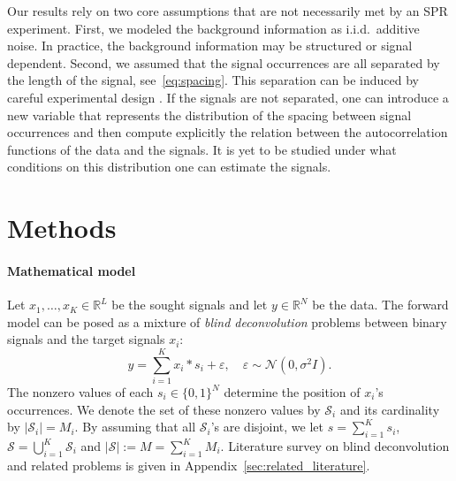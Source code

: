 \documentclass[english,11pt]{article}
\newcommand{\TODO}[1]{{\color{red}{[#1]}}}
\numberwithin{equation}{section}
\theoremstyle{plain}
\theoremstyle{definition}
\theoremstyle{remark}
\theoremstyle{plain}
\theoremstyle{remark}
\theoremstyle{plain}
\theoremstyle{plain}
\newcommand{\RL}{\mathbb{R}^L}
\newcommand{\RN}{\mathbb{R}^N}
\begin{document}
Our results rely on two core assumptions that are not necessarily met by an SPR experiment.  
First, we modeled the background information as i.i.d.\ additive noise. In practice, the background information may be structured or signal dependent. 
Second, we assumed that the signal occurrences are all separated by the length of the signal, see~\eqref{eq:spacing}. 
This separation can be induced by careful experimental design \TODO{???}. 
If the signals are not separated, one can introduce a new variable that represents the distribution of the spacing between signal occurrences and then compute explicitly the relation between the autocorrelation functions of the data and the signals. It is yet to be studied under what conditions on this distribution one can estimate the signals. 



\section{Methods} \label{sec:methods}


\paragraph{Mathematical model}

Let $x_1,\ldots,x_K\in\RL$ be the sought signals and let $y\in\RN$ be the data. 
The forward model can be posed as a mixture of \emph{blind deconvolution} problems between binary signals and the target signals $x_i$:
\begin{equation} \label{eq:model}
y = \sum_{i=1}^K x_i\ast s_i + \varepsilon,\quad \varepsilon\sim\mathcal{N}(0,\sigma^2 I).
\end{equation}
The nonzero values of each  $s_i\in\{0,1\}^N$ determine the position of $x_i$'s occurrences. 
We denote the set of these nonzero values by 
 $\mathcal{S}_i$ and its cardinality by $\vert \mathcal{S}_i\vert = M_i$. 
By assuming that all $\mathcal{S}_i$'s are disjoint,  we let $s = \sum_{i=1}^Ks_i$, $\mathcal{S} = \bigcup_{i=1}^{K} \mathcal{S}_i$ and  $\vert \mathcal{S}\vert :=M =  \sum_{i=1}^{K}M_i$.  %
 Literature survey on blind deconvolution and related problems is given in Appendix~\ref{sec:related_literature}.
\end{document}

